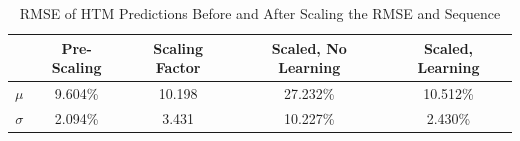 \documentclass[oneside,12pt,openany]{book}
\begin{document}
     \begin{table}[hbt!]
        \centering
        \begin{tabular}{|c|c|c|c|c|}
            \hline
            \textbf{} & \textbf{Pre-Scaling} & \textbf{Scaling Factor} & \textbf{Scaled, No Learning} & \textbf{Scaled, Learning} \\ \hline
            \textbf{$\mu$} & 9.604\% & 10.198 & 27.232\% & 10.512\% \\ \hline
            \textbf{$\sigma$} & 2.094\% & 3.431 & 10.227\% & 2.430\% \\ \hline
        \end{tabular}\caption{RMSE of HTM Predictions Before and After Scaling the RMSE and Sequence}
        \label{tab:genscatter:changed}
    \end{table}
\end{document}
